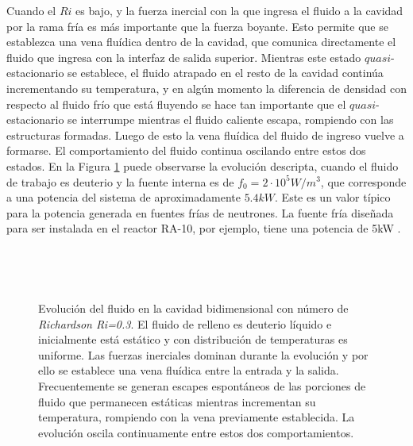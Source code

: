 Cuando el $Ri$ es bajo,
y la fuerza inercial con la que ingresa el fluido a la cavidad por la rama fría es más importante que la fuerza boyante.
Esto permite que se establezca una vena fluídica dentro de la cavidad, que comunica directamente el fluido que ingresa con la interfaz de salida superior.
Mientras este estado $quasi$-estacionario se establece, el fluido atrapado en el resto de la cavidad continúa incrementando su temperatura,
y en algún momento la diferencia de densidad con respecto al fluido frío que está fluyendo se hace tan importante
que el $quasi$-estacionario se interrumpe mientras el fluido caliente escapa, rompiendo con las estructuras formadas.
Luego de esto la vena fluídica del fluido de ingreso vuelve a formarse.
El comportamiento del fluido continua oscilando entre estos dos estados.
En la Figura \ref{evol-ri03} puede observarse la evolución descripta, cuando el fluido de trabajo es deuterio y la fuente interna es de $f_0=2\cdot10^5W/m^3$,
que corresponde a una potencia del sistema de aproximadamente $5.4kW$.
Este es un valor típico para la potencia generada en fuentes frías de neutrones.
La fuente fría diseñada para ser instalada en el reactor RA-10, por ejemplo, tiene una potencia de 5kW \cite{ra10}.

\begin{figure}[ht]
\begin{minipage}{.5\linewidth}
\centering
{}\\
\end{minipage}\hfill
\begin{minipage}{.5\linewidth}
\centering
{}\\
\end{minipage}
\caption[Evolución del fluido en la cavidad bidimensional a bajo Richardson]
{Evolución del fluido en la cavidad bidimensional con número de \textit{Richardson Ri=0.3}.
 El fluido de relleno es deuterio líquido e inicialmente está estático y con distribución de temperaturas es uniforme.
 Las fuerzas inerciales dominan durante la evolución y por ello se establece una vena fluídica entre la entrada y la salida.
 Frecuentemente se generan escapes espontáneos de las porciones de fluido que permanecen estáticas mientras incrementan su temperatura, rompiendo con la vena previamente establecida.
 La evolución oscila continuamente entre estos dos comportamientos.}
\label{evol-ri03}
\end{figure}

